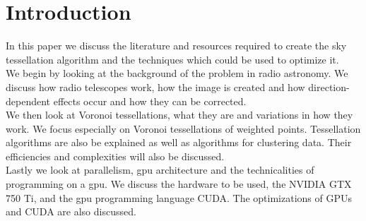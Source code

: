 \section{Introduction}\label{int}
In this paper we discuss the literature and resources required to create the sky tessellation algorithm and the techniques which could be used to optimize it.
\\
We begin by looking at the background of the problem in radio astronomy. We discuss how radio telescopes work, how the image is created and how direction-dependent effects occur and how they can be corrected.
\\
We then look at Voronoi tessellations, what they are and variations in how they work. We focus especially on Voronoi tessellations of weighted points. Tessellation algorithms are also be explained as well as algorithms for clustering data. Their efficiencies and complexities will also be discussed.
\\
Lastly we look at parallelism, \gls{gpu} architecture and the technicalities of programming on a \gls{gpu}. We discuss the hardware to be used, the NVIDIA GTX 750 Ti, and the \gls{gpu} programming language CUDA. The optimizations of GPUs and CUDA are also discussed.
